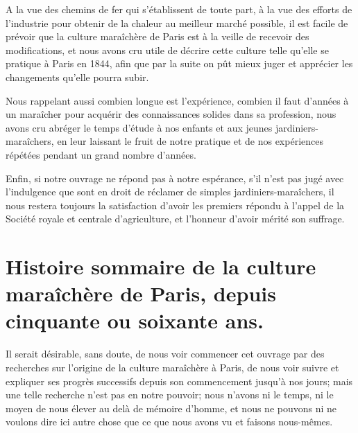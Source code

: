 \documentclass[10pt,a4paper]{book}
\begin{document}
A la vue des chemins de fer qui s'établissent de toute part, à la vue des efforts de l'industrie pour obtenir de la chaleur au meilleur marché possible, il est facile de prévoir que la culture maraîchère de Paris est à la veille de recevoir des modifications, et nous avons cru utile de décrire cette culture telle qu'elle se pratique à Paris en 1844, afin que par la suite on pût mieux juger et apprécier les changements qu'elle pourra subir.

Nous rappelant aussi combien longue est l'expérience, combien il faut d'années à un maraîcher pour acquérir des connaissances solides dans sa profession, nous avons cru abréger le temps d'étude à nos enfants et aux jeunes jardiniers-maraîchers, en leur laissant le fruit de notre pratique et de nos expériences répétées pendant un grand nombre d'années.

Enfin, si notre ouvrage ne répond pas à notre espérance, s'il n'est pas jugé avec l'indulgence que sont en droit de réclamer de simples jardiniers-maraîchers, il nous restera toujours la satisfaction d'avoir les premiers répondu à l'appel de la Société royale et centrale d'agriculture, et l'honneur d'avoir mérité son suffrage.

\tableofcontents

\chapter{Histoire sommaire de la culture maraîchère de Paris, depuis cinquante ou soixante ans.}

\lhead[\rightmark]{\thepage}
\rhead[\thepage]{\leftmark}

\setcounter{page}{1}
\renewcommand{\thepage}{\arabic{page}}

Il serait désirable, sans doute, de nous voir commencer cet ouvrage par des recherches sur l'origine de la culture maraîchère à Paris, de nous voir suivre et expliquer ses progrès successifs depuis son commencement jusqu'à nos jours; mais une telle recherche n'est pas en notre pouvoir; nous n'avons ni le temps, ni le moyen de nous élever au delà de mémoire d'homme, et nous ne pouvons ni ne voulons dire ici autre chose que ce que nous avons vu et faisons nous-mêmes.
\end{document}
